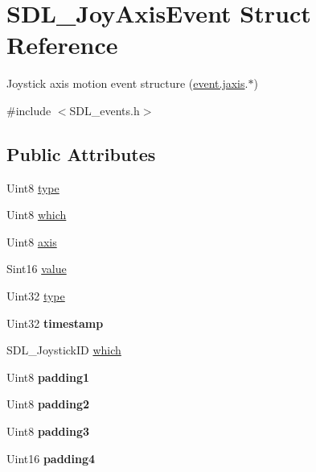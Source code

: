 \hypertarget{structSDL__JoyAxisEvent}{\section{S\+D\+L\+\_\+\+Joy\+Axis\+Event Struct Reference}
\label{structSDL__JoyAxisEvent}
}


Joystick axis motion event structure (\hyperlink{unionSDL__Event_ac4611acd0e9c675e67dc20919f0accb4}{event.\+jaxis}.$\ast$)  




{\ttfamily \#include $<$S\+D\+L\+\_\+events.\+h$>$}

\subsection*{Public Attributes}
\begin{DoxyCompactItemize}
\item 
Uint8 \hyperlink{structSDL__JoyAxisEvent_aed1c873fb90ba58194e65f972933c67d}{type}
\item 
Uint8 \hyperlink{structSDL__JoyAxisEvent_a965719f4703a7091bcc5f07f79fcf7e1}{which}
\item 
Uint8 \hyperlink{structSDL__JoyAxisEvent_a0beac2fb161e45771c424bd0b6daeabb}{axis}
\item 
Sint16 \hyperlink{structSDL__JoyAxisEvent_a53ee73e7c367934dd6edb69963be5556}{value}
\item 
Uint32 \hyperlink{structSDL__JoyAxisEvent_aed1c873fb90ba58194e65f972933c67d}{type}
\item 
\hypertarget{structSDL__JoyAxisEvent_a60ecfc70df9eeef8e33b5dd7dc060389}{Uint32 {\bfseries timestamp}}\label{structSDL__JoyAxisEvent_a60ecfc70df9eeef8e33b5dd7dc060389}

\item 
S\+D\+L\+\_\+\+Joystick\+I\+D \hyperlink{structSDL__JoyAxisEvent_a965719f4703a7091bcc5f07f79fcf7e1}{which}
\item 
\hypertarget{structSDL__JoyAxisEvent_ae8e17bced478530638982f0382a0dafa}{Uint8 {\bfseries padding1}}\label{structSDL__JoyAxisEvent_ae8e17bced478530638982f0382a0dafa}

\item 
\hypertarget{structSDL__JoyAxisEvent_ad5407250032f618fde7437ac5f229257}{Uint8 {\bfseries padding2}}\label{structSDL__JoyAxisEvent_ad5407250032f618fde7437ac5f229257}

\item 
\hypertarget{structSDL__JoyAxisEvent_a8bf5144fddc19686c2003add1f0e1565}{Uint8 {\bfseries padding3}}\label{structSDL__JoyAxisEvent_a8bf5144fddc19686c2003add1f0e1565}

\item 
\hypertarget{structSDL__JoyAxisEvent_a604b258940a8cd8beaa5efeb55d6f825}{Uint16 {\bfseries padding4}}\label{structSDL__JoyAxisEvent_a604b258940a8cd8beaa5efeb55d6f825}

\end{DoxyCompactItemize}


